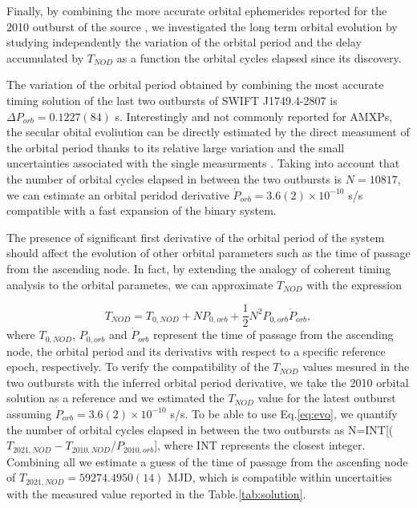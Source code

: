 \documentclass[fleqn,usenatbib]{mnras}
\newcommand{\swiftj}{SWIFT J1749.4-2807}
\begin{document}
Finally, by combining the more accurate orbital ephemerides reported for the 2010 outburst of the source \citep{Markwardt:2010tl}, we investigated the long term orbital evolution by studying independently the variation of the orbital period and the delay accumulated by $T_{NOD}$ as a function the orbital cycles elapsed since its discovery. 

The variation of the orbital period obtained by combining the most accurate timing solution of the last two outbursts of \swiftj{} is $\Delta P_{orb}=0.1227(84)$ s. Interestingly and not commonly reported for AMXPs, the secular obital evoliution can be directly estimated by the direct measument of the orbital period thanks to its relative large variation and the small uncertainties associated with the single measurments \citep[somehting similar has been observed only for the AMXP IGR J17511-3057][]{Riggio2021}. Taking into account that the number of orbital cycles elapsed in between the two outbursts is $N=10817$, we can estimate an orbital peridod derivative $\dot{P}_{orb}=3.6(2)\times 10^{-10}$ s/s compatible with a fast expansion of the binary system.

The presence of significant first derivative of the orbital period of the system should affect the evolution of other orbital parameters such as the time of passage from the ascending node. In fact, by extending the analogy of coherent timing analysis to the orbital parametes, we can approximate $T_{NOD}$ with the expression

\begin{equation}
\label{eq:evo}
T_{NOD}=T_{0,NOD}+N P_{0,orb}+\frac{1}{2}N^2P_{0,orb}\dot{P}_{orb},
\end{equation}
where $T_{0,NOD}$, $P_{0,orb}$ and $\dot{P}_{orb}$ represent the time of passage from the ascending node, the orbital period and its derivativs with respect to a specific reference epoch, respectively. 
To verify the compatibility of the $T_{NOD}$ values mesured in the two outbursts with the inferred orbital period derivative, we take the 2010 orbital solution as a reference and we estimated the $T_{NOD}$ value for the latest outburst assuming $\dot{P}_{orb}=3.6(2)\times 10^{-10}$ s/s. To be able to use Eq.\ref{eq:evo}, we quantify the number of orbital cycles elapsed in between the two outbursts as N=INT[($T_{2021,NOD}-T_{2010,NOD}$/$P_{2010,orb}$], where INT represents the closest integer. Combining all we estimate a guess of the time of passage from the ascenfing node of $T_{2021,NOD}=59274.4950(14)$ MJD, which is compatible within uncertaities with the measured value reported in the Table.\ref{tab:solution}.
\end{document}
